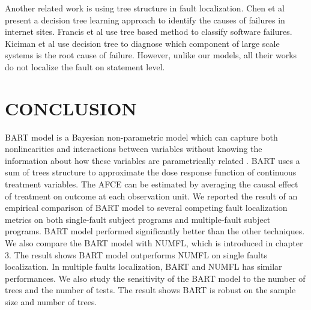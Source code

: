 Another related work is using tree structure in fault localization. Chen et al \cite{} present a decision tree learning approach to identify the causes of failures in internet sites. Francis et al \cite{} use tree based method to classify software failures. Kiciman et al \cite{} use decision tree to diagnose which component of large scale systems is the root cause of failure. However, unlike our models, all their works do not localize the fault on statement level.

\section{CONCLUSION}\label{BARTconclusion}
BART model is a Bayesian non-parametric model which can capture both nonlinearities and interactions between variables without knowing the information about how these variables are parametrically related . BART uses a sum of trees structure to approximate the dose response function of continuous treatment variables. The AFCE can be estimated by averaging the causal effect of treatment on outcome at each observation unit. We reported the result of an empirical comparison of BART model to several competing fault localization metrics on both single-fault subject programs and multiple-fault subject programs. BART model performed significantly better than the other techniques. We also compare the BART model with NUMFL, which is introduced in chapter 3. The result shows BART model outperforms NUMFL on single faults localization. In multiple faults localization, BART and NUMFL has similar performances.  We also study the sensitivity of the BART model to the number of trees and the number of tests. The result shows BART is robust on the sample size and number of trees.  
